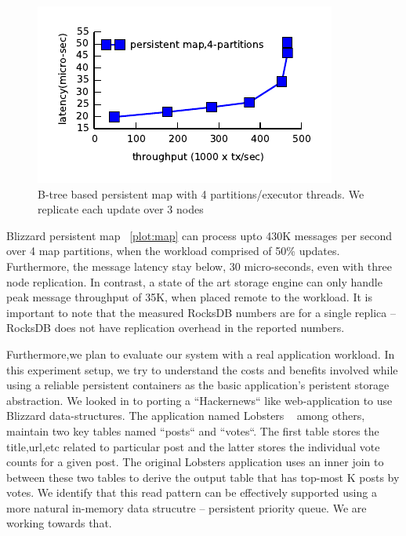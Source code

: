 \begin{figure}[tbp]   
	\centering
	\includegraphics[width=\linewidth]{plot/bliztree-partition.pdf} 
	\caption{\small B-tree based persistent map with 4 partitions/executor threads. We replicate each update over 3 nodes} 
	\label{plot:map} 
\end{figure}


Blizzard persistent map ~\autoref{plot:map} can process upto 430K messages per second over 4 map partitions, when the 
workload comprised of 50\% updates. Furthermore, the message latency stay below, 30 micro-seconds, even with three node
replication. In contrast, a state of the art storage engine can only handle peak message throughput of 35K, when 
placed remote to the workload. It is important to note that the measured RocksDB numbers are for a single replica -- RocksDB
does not have replication overhead in the reported numbers. 


Furthermore,we plan to evaluate our system with a real application workload. In this experiment setup, we try to understand the costs
and benefits involved while using a reliable persistent containers as the basic application's peristent storage abstraction.
We looked in to porting a ``Hackernews`` like web-application to use Blizzard data-structures. The application named Lobsters
~\cite{lobsters} among others, maintain two key tables named ``posts`` and ``votes``. The first table stores the 
title,url,etc related to particular post and the latter stores the individual vote counts for a given post. The original
Lobsters application uses an inner join to between these two tables to derive the output table that has top-most K posts
by votes. We identify that this read pattern can be effectively supported using a more natural in-memory data strucutre --
persistent priority queue. We are working towards that.



